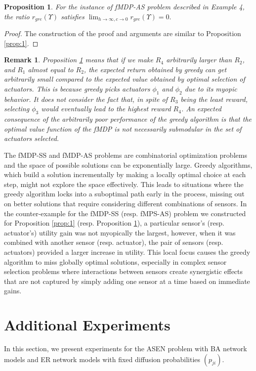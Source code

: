 \documentclass[twocolumn]{autart}    %
\newtheorem{proposition}{Proposition}
\newtheorem{remark}{Remark}
\begin{document}
\begin{proposition}
\label{prop:2}
For the instance of fMDP-AS problem described in Example 4, the ratio $ r_{gre}(\Upsilon)$ satisfies  $\lim_{h \rightarrow \infty, c \rightarrow 0} r_{gre}(\Upsilon) = 0. $

\end{proposition}
\begin{proof}
    The construction of the proof and arguments are similar to Proposition \ref{prop:1}.
\end{proof}

\begin{remark}
    Proposition \ref{prop:2} means that if we make $R_4$ arbitrarily larger than $R_2$, and $R_1$ almost equal to $R_2$, the expected return obtained by greedy can get arbitrarily small compared to the expected value obtained by optimal selection of actuators. This is because greedy picks actuators $\phi_1$ and $\phi_2$ due to its myopic behavior. It does not consider the fact that, in spite of $R_3$ being the least reward, selecting $\phi_3$ would eventually lead to the highest reward $R_4$. An expected consequence of the arbitrarily poor performance of the greedy algorithm is that the optimal value function of the fMDP is not necessarily submodular in the set of actuators selected.
\end{remark}
 The fMDP-SS and fMDP-AS problems are combinatorial optimization problems and the space of possible solutions can be exponentially large. Greedy algorithms, which build a solution incrementally by making a locally optimal choice at each step, might not explore the space effectively. This leads to situations where the greedy algorithm locks into a suboptimal path early in the process, missing out on better solutions that require considering different combinations of sensors. In the counter-example for the fMDP-SS (resp. fMPS-AS) problem we constructed for Proposition \ref{prop:1} (resp. Proposition \ref{prop:2}), a particular sensor's (resp. actuator's) utility gain was not myopically the largest, however, when it was combined with another sensor (resp. actuator), the pair of sensors (resp. actuators) provided a larger increase in utility. This local focus causes the greedy algorithm to miss globally optimal solutions, especially in complex sensor selection problems where interactions between sensors create synergistic effects that are not captured by simply adding one sensor at a time based on immediate gains.

 \section{Additional Experiments}
In this section, we present experiments for the ASEN problem with BA network models and ER network models with fixed diffusion probabilities $(p_{ji})$.
\label{app:add_exp}
\end{document}
